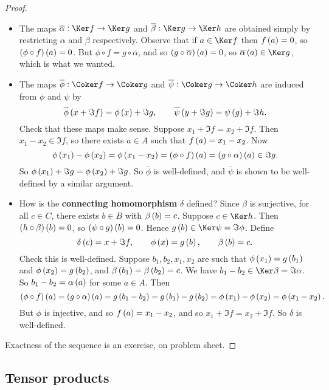 \begin{proof}
\hfill
\begin{itemize}
\item The maps $ \overline{\alpha} : \Ker f \to \Ker g $ and $ \overline{\beta} : \Ker g \to \Ker h $ are obtained simply by restricting $ \alpha $ and $ \beta $ respectively. Observe that if $ a \in \Ker f $ then $ f\br{a} = 0 $, so $ \br{\phi \circ f}\br{a} = 0 $. But $ \phi \circ f = g \circ \overline{\alpha} $, and so $ \br{g \circ \overline{\alpha}}\br{a} = 0 $, so $ \overline{\alpha}\br{a} \in \Ker g $, which is what we wanted.
\item The maps $ \overline{\phi} : \Coker f \to \Coker g $ and $ \overline{\psi} : \Coker g \to \Coker h $ are induced from $ \phi $ and $ \psi $ by
$$ \overline{\phi}\br{x + \Im f} = \phi\br{x} + \Im g, \qquad \overline{\psi}\br{y + \Im g} = \psi\br{g} + \Im h. $$
Check that these maps make sense. Suppose $ x_1 + \Im f = x_2 + \Im f $. Then $ x_1 - x_2 \in \Im f $, so there exists $ a \in A $ such that $ f\br{a} = x_1 - x_2 $. Now
$$ \phi\br{x_1} - \phi\br{x_2} = \phi\br{x_1 - x_2} = \br{\phi \circ f}\br{a} = \br{g \circ \alpha}\br{a} \in \Im g. $$
So $ \phi\br{x_1} + \Im g = \phi\br{x_2} + \Im g $. So $ \overline{\phi} $ is well-defined, and $ \overline{\psi} $ is shown to be well-defined by a similar argument.
\item How is the \textbf{connecting homomorphism} $ \delta $ defined? Since $ \beta $ is surjective, for all $ c \in C $, there exists $ b \in B $ with $ \beta\br{b} = c $. Suppose $ c \in \Ker h $. Then $ \br{h \circ \beta}\br{b} = 0 $, so $ \br{\psi \circ g}\br{b} = 0 $. Hence $ g\br{b} \in \Ker \psi = \Im \phi $. Define
$$ \delta\br{c} = x + \Im f, \qquad \phi\br{x} = g\br{b}, \qquad \beta\br{b} = c. $$
Check this is well-defined. Suppose $ b_1, b_2, x_1, x_2 $ are such that $ \phi\br{x_1} = g\br{b_1} $ and $ \phi\br{x_2} = g\br{b_2} $, and $ \beta\br{b_1} = \beta\br{b_2} = c $. We have $ b_1 - b_2 \in \Ker \beta = \Im \alpha $. So $ b_1 - b_2 = \alpha\br{a} $ for some $ a \in A $. Then
$$ \br{\phi \circ f}\br{a} = \br{g \circ \alpha}\br{a} = g\br{b_1 - b_2} = g\br{b_1} - g\br{b_2} = \phi\br{x_1} - \phi\br{x_2} = \phi\br{x_1 - x_2}. $$
But $ \phi $ is injective, and so $ f\br{a} = x_1 - x_2 $, and so $ x_1 + \Im f = x_2 + \Im f $. So $ \delta $ is well-defined.
\end{itemize}
Exactness of the sequence is an exercise, on problem sheet.
\end{proof}

\subsection{Tensor products}

